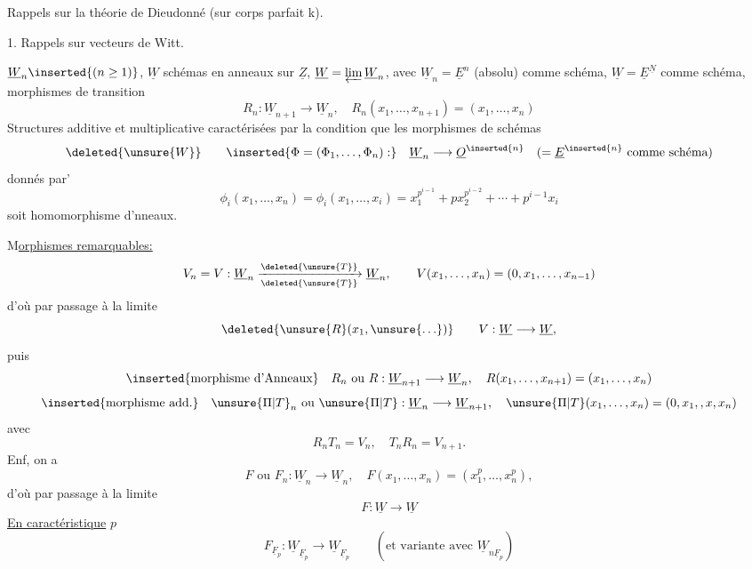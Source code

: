 
Rappels sur la théorie de Dieudonné (sur corps parfait k).


1. Rappels sur vecteurs de Witt.


$\underline{W}_n\inserted{(n\geq1)}$, $\underline{W}$ schémas en anneaux sur $\underline{Z}$, $\underline{W}=\varprojlim\underline{W}_n$, avec
$\underline{W}_n=\underline{E}^{n}$ (absolu) comme schéma, $\underline{W}=\underline{E}^{\underline{N}}$ comme schéma, morphismes de transition
\[
R_n:\underline{W}_{n+1}\longrightarrow\underline{W}_n,\quad
R_n(x_1,\ldots,x_{n+1})=(x_1,\ldots,x_n)
\]
Structures additive et multiplicative caractérisées par la condition que les morphismes de schémas
\[
\deleted{\unsure{W}}\qquad
\inserted{\Phi=(\Phi_1,\ldots,\Phi_n):}\quad
\underline{W}_n\longrightarrow\underline{O}^{\inserted{n}}\quad
(=\underline{E}^{\inserted{n}}\text{ comme schéma})
\]
donnés par'
\[
\phi_i(x_1,\ldots,x_n)=\phi_i(x_1,\ldots,x_i)
=x_1^{p^{i-1}}+px_2^{p^{i-2}}+\cdots+p^{i-1}x_i
\]
soit  homomorphisme d'nneaux.

M\uline{orphismes remarquables:} 
\[
V_n=V:\underline{W}_n
\xrightarrow[\deleted{\unsure{T}}]{\deleted{\unsure{T}}}\underline{W}_n,\qquad
V(x_1,\ldots,x_n)=(0,x_1,\ldots,x_{n-1})
\]
 d'où par passage à la limite
\[
\deleted{\unsure{R}(x_1,\unsure{\ldots})}\qquad
V:\underline{W}\longrightarrow\underline{W},
\]
puis 
\[
\inserted{\text{morphisme d'Anneaux}}\quad
R_n\text{ ou }R:\underline{W}_{n+1}\longrightarrow\underline{W}_n,
\quad R(x_1,\ldots,x_{n+1})=(x_1,\ldots,x_n)
\]
\[
\inserted{\text{morphisme add.}}\quad
\unsure{\Pi|T}_n\text{ ou }\unsure{\Pi|T}:\underline{W}_n\longrightarrow\underline{W}_{n+1},
\quad\unsure{\Pi|T}(x_1,\ldots,x_n)=(0,x_1,,x,x_n)
\]
avec
\[
R_nT_n=V_n,\quad T_nR_n=V_{n+1}.
\]
Enf, on a
\[
F\text{ ou }F_n:\underline{W}_n\longrightarrow\underline{W}_n,\quad
F(x_1,\ldots,x_n)=(x_1^p,\ldots,x_n^p),
\]
d'où par passage à la limite
\[
F:\underline{W}\longrightarrow\underline{W}
\]
\uline{En caractéristique} $p$
\[
F_{\underline{F}_p}:\underline{W}_{\underline{F}_p}\longrightarrow\underline{W}_{\underline{F}_p}
\qquad(\text{et variante avec }\underline{W}_{n\underline{F}_p})
\]
